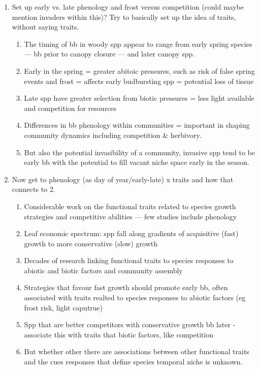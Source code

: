 \documentclass{article}
\begin{document}
\begin{enumerate}
\item Set up early vs. late phenology and frost versus competition (could maybe mention invaders within this)? Try to basically set up the idea of traits, without saying traits.
\begin{enumerate}
\item The timing of bb in woody spp appear to range from early spring species — bb prior to canopy closure — and later canopy spp. 
\item Early in the spring = greater abitoic pressures, such as risk of false spring events and frost = affects early budbursting spp = potential loss of tissue
\item Late spp have greater selection from biotic pressures = less light available and competition for resources 
\item Differences in bb phenology within communities = important in shaping community dynamics including competition \& herbivory. 
\item But also the potential invasibility of a community, invasive spp tend to be early bb with the potential to fill vacant niche space early in the season. 
\end{enumerate}

\item Now get to phenology (as day of year/early-late) x traits and how that connects to 2. %
\begin{enumerate}
\item Considerable work on the functional traits related to species growth strategies and competitive abilities — few studies include phenology
\item Leaf economic spectrum: spp fall along gradients of acquisitive (fast) growth to more conservative (slow) growth %
\item Decades of research linking functional traits to species responses to abiotic and biotic factors and community assembly
\item Strategies that favour fast growth should promote early bb, often associated with traits realted to species responses to abiotic factors (eg frost risk, light caputrue)
\item Spp that are better competitors with conservative growth bb later - associate this with traits that biotic factors, like competition
\item But whether other there are associations between other functional traits and the cues responses that define species temporal niche is unknown.
\end{enumerate}


\end{enumerate}
\end{document}
